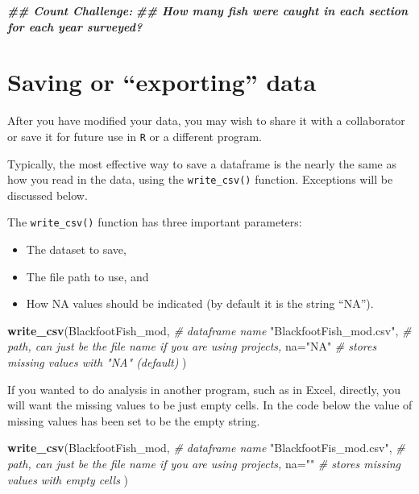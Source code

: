 \documentclass[
  10pt,
  letterpaper,
  twoside,
  openright]{book}
\newenvironment{Shaded}{\begin{snugshade}}{\end{snugshade}}
\newcommand{\AttributeTok}[1]{\textcolor[rgb]{0.13,0.29,0.53}{#1}}
\newcommand{\CommentTok}[1]{\textcolor[rgb]{0.56,0.35,0.01}{\textit{#1}}}
\newcommand{\DocumentationTok}[1]{\textcolor[rgb]{0.56,0.35,0.01}{\textbf{\textit{#1}}}}
\newcommand{\FunctionTok}[1]{\textcolor[rgb]{0.13,0.29,0.53}{\textbf{#1}}}
\newcommand{\NormalTok}[1]{#1}
\newcommand{\StringTok}[1]{\textcolor[rgb]{0.31,0.60,0.02}{#1}}
\providecommand{\tightlist}{%
  \setlength{\itemsep}{0pt}\setlength{\parskip}{0pt}}
\begin{document}
\begin{Shaded}
\begin{Highlighting}[]
\DocumentationTok{\#\# Count Challenge:}
\DocumentationTok{\#\#  How many fish were caught in each section for each year surveyed?}
\end{Highlighting}
\end{Shaded}

\hypertarget{saving-or-exporting-data}{%
\section{Saving or ``exporting'' data}\label{saving-or-exporting-data}}

After you have modified your data, you may wish to share it with a
collaborator or save it for future use in \texttt{R} or a different
program.

Typically, the most effective way to save a dataframe is the nearly the
same as how you read in the data, using the \texttt{write\_csv()}
function. Exceptions will be discussed below.

The \texttt{write\_csv()} function has three important parameters:

\begin{itemize}
\tightlist
\item
  The dataset to save,
\item
  The file path to use, and
\item
  How NA values should be indicated (by default it is the string
  ``NA'').
\end{itemize}

\begin{Shaded}
\begin{Highlighting}[]
\FunctionTok{write\_csv}\NormalTok{(BlackfootFish\_mod, }\CommentTok{\# dataframe name}
          \StringTok{"BlackfootFish\_mod.csv"}\NormalTok{, }\CommentTok{\# path, can just be the file name if you are using projects,}
          \AttributeTok{na=}\StringTok{"NA"} \CommentTok{\# stores missing values with "NA" (default)}
\NormalTok{          )}
\end{Highlighting}
\end{Shaded}

If you wanted to do analysis in another program, such as in Excel,
directly, you will want the missing values to be just empty cells. In
the code below the value of missing values has been set to be the empty
string.

\begin{Shaded}
\begin{Highlighting}[]
\FunctionTok{write\_csv}\NormalTok{(BlackfootFish\_mod, }\CommentTok{\# dataframe name}
          \StringTok{"BlackfootFis\_mod.csv"}\NormalTok{, }\CommentTok{\# path, can just be the file name if you are using projects,}
          \AttributeTok{na=}\StringTok{""} \CommentTok{\# stores missing values with empty cells}
\NormalTok{          )}
\end{Highlighting}
\end{Shaded}
\end{document}
